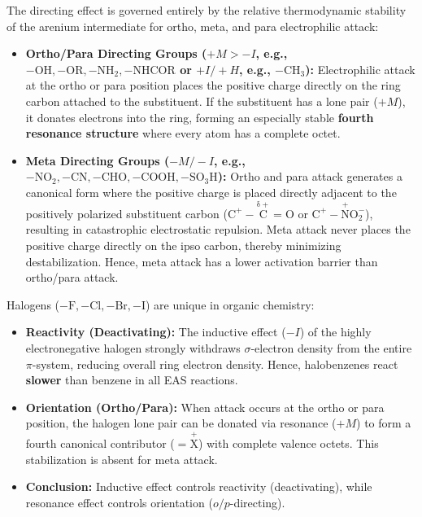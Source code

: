\documentclass[10pt,a4paper]{article}
\begin{document}
\begin{conceptbox}
The directing effect is governed entirely by the relative thermodynamic stability of the arenium intermediate for ortho, meta, and para electrophilic attack:
\begin{itemize}
  \item \textbf{Ortho/Para Directing Groups ($+M > -I$, e.g., $-\mathrm{OH, -OR, -NH_2, -NHCOR}$ or $+I/+H$, e.g., $-\mathrm{CH_3}$):}
  Electrophilic attack at the ortho or para position places the positive charge directly on the ring carbon attached to the substituent. If the substituent has a lone pair ($+M$), it donates electrons into the ring, forming an especially stable \textbf{fourth resonance structure} where every atom has a complete octet.
  \item \textbf{Meta Directing Groups ($-M / -I$, e.g., $-\mathrm{NO_2, -CN, -CHO, -COOH, -SO_3H}$):}
  Ortho and para attack generates a canonical form where the positive charge is placed directly adjacent to the positively polarized substituent carbon ($\mathrm{C^+-\overset{\delta+}{C}=O}$ or $\mathrm{C^+-\overset{+}{N}O_2^-}$), resulting in catastrophic electrostatic repulsion. Meta attack never places the positive charge directly on the ipso carbon, thereby minimizing destabilization. Hence, meta attack has a lower activation barrier than ortho/para attack.
\end{itemize}
\end{conceptbox}

\begin{trapbox}
Halogens ($-\mathrm{F, -Cl, -Br, -I}$) are unique in organic chemistry:
\begin{itemize}
  \item \textbf{Reactivity (Deactivating):} The inductive effect ($-I$) of the highly electronegative halogen strongly withdraws $\sigma$-electron density from the entire $\pi$-system, reducing overall ring electron density. Hence, halobenzenes react \textbf{slower} than benzene in all EAS reactions.
  \item \textbf{Orientation (Ortho/Para):} When attack occurs at the ortho or para position, the halogen lone pair can be donated via resonance ($+M$) to form a fourth canonical contributor ($=\overset{+}{\mathrm{X}}$) with complete valence octets. This stabilization is absent for meta attack.
  \item \textbf{Conclusion:} Inductive effect controls reactivity (deactivating), while resonance effect controls orientation ($o/p$-directing).
\end{itemize}
\end{trapbox}
\end{document}
